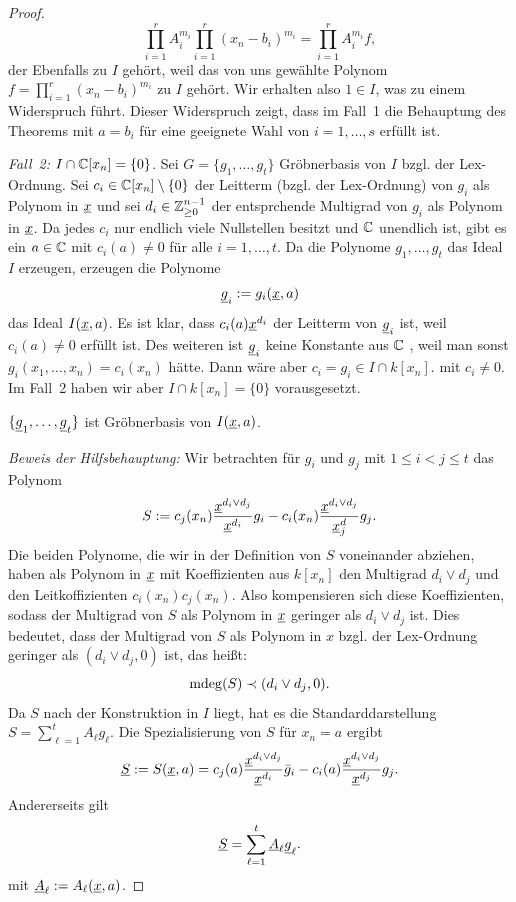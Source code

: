 \documentclass[11pt]{article}
\numberwithin{equation}{section}
\begin{document}
\begin{proof}
\[
	\prod_{i=1}^r A_i^{m_i} \prod_{i=1}^r (x_n-b_i)^{m_i} = \prod_{i=1}^r  A_i^{m_i} f,
\] der Ebenfalls zu $I$ gehört, weil das von uns gewählte  Polynom $f = \prod_{i=1}^r (x_n -b_i)^{m_i}$ zu $I$ gehört. Wir erhalten also $1 \in I$, was zu einem Widerspruch führt. Dieser Widerspruch zeigt, dass im Fall~1 die Behauptung des Theorems mit $a= b_i$ für eine geeignete Wahl von $i = 1,\ldots, s$ erfüllt ist. 

\emph{Fall~2:} $I \cap \mathbb{C}[x_n] = \{0\}$. Sei $G = \{g_1,\ldots,g_t\}$ Gröbnerbasis von $I$ bzgl. der Lex-Ordnung. Sei $c_i \in \mathbb{C}[x_n] \setminus \{0\}$ der Leitterm (bzgl. der Lex-Ordnung) von $g_i$ als Polynom in $\underline{x}$ und sei $d_i \in \mathbb{Z}_{\ge 0}^{n-1}$ der entsprchende Multigrad von $g_i$ als Polynom in $\underline{x}$. Da jedes $c_i$ nur endlich viele Nullstellen besitzt und $\mathbb{C}$ unendlich ist, gibt es ein $a \in \mathbb{C}$ mit $c_i(a) \ne 0$ für alle $i=1,\ldots,t$. Da die Polynome $g_1,\ldots,g_t$ das Ideal $I$ erzeugen, erzeugen die Polynome 
\[
\underline{g}_i  : = g_i(\underline{x},a) 
\]
das Ideal $I(\underline{x},a)$. Es ist klar, dass $c_i(a) \underline{x}^{d_i}$ der Leitterm von $\underline{g}_i$ ist, weil $c_i(a) \ne 0$ erfüllt ist. Des weiteren ist $\underline{g}_i$ keine Konstante aus $\mathbb{C}$ , weil man sonst $g_i (x_1,\ldots,x_n) = c_i(x_n)$ hätte. Dann wäre aber $c_i = g_i \in I \cap k[x_n]$. mit $c_i \ne 0$. Im Fall~2 haben wir aber $I \cap k[x_n] = \{0\}$ vorausgesetzt. 

\begin{claim*} $\{ \underline{g}_1,\ldots,\underline{g}_t \}$ ist Gröbnerbasis von $I(\underline{x}, a)$. 
\end{claim*} 

\emph{Beweis der Hilfsbehauptung:} 
Wir betrachten für $g_i$ und $g_j$ mit $1 \le i < j \le t$ das Polynom 
\[	
S := c_j(x_n) \frac{\underline{x}^{d_i \vee d_j}}{ \underline{x}^{d_i} }g_i - c_i(x_n) \frac{\underline{x}^{d_i \vee d_j}}{\underline{x}^d_j} g_j.
\]
Die beiden Polynome, die wir in der Definition von $S$ voneinander abziehen, haben als Polynom in $\underline{x}$ mit Koeffizienten aus $k[x_n]$ den Multigrad $d_i \vee d_j$ und den Leitkoffizienten $c_i(x_n) c_j(x_n)$. Also kompensieren sich diese Koeffizienten, sodass der Multigrad von $S$ als Polynom in $\underline{x}$ geringer als $d_i \vee d_j$ ist. Dies bedeutet, dass der Multigrad von $S$ als Polynom in $x$ bzgl. der Lex-Ordnung geringer als $(d_i \vee d_j, 0)$ ist, das heißt: 
\[
	\operatorname{mdeg}(S) \prec (d_i \vee d_j, 0). 
\]
 Da $S$ nach der Konstruktion in $I$ liegt, hat es die Standarddarstellung $S = \sum_{\ell =1}^t A_\ell g_\ell$. Die Spezialisierung von $S$ für  $x_n = a$ ergibt 
\[
\underline{S} := S(\underline{x},a) =
c_j(a) \frac{\underline{x}^{d_i \vee d_j}}{\underline{x}^{d_i}} \bar{g}_i - c_i(a) \frac{\underline{x}^{d_i \vee d_j}}{\underline{x}^{d_j}} g_j. 
\]
Andererseits gilt
\[
\underline{S} =\sum_{\ell=1}^t  \underline{A}_\ell \underline{g}_\ell. 
\]
mit $\underline{A}_\ell  := A_\ell(\underline{x},a)$. 


\end{proof}
\end{document}
